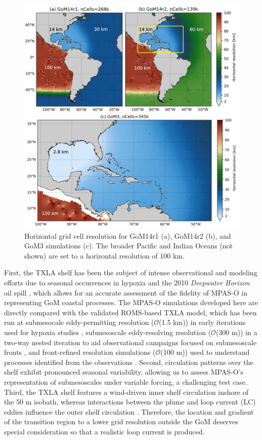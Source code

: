 \begin{figure}[t!]
\centerline{\includegraphics[width = \textwidth]{figures/scgsr/gom_resolutions.jpg}}
    \caption{Horizontal grid cell resolution for GoM14r1 (a), GoM14r2 (b), and GoM3 simulations (c). The broader Pacific and Indian Oceans (not shown) are set to a horizontal resolution of 100 km.}
    \label{fig:mesh_overview}
\end{figure}

First, the TXLA shelf has been the subject of intense observational and modeling efforts due to seasonal occurrences in hypoxia and the 2010 \textit{Deepwater Horizon} oil spill \citep{bianchi2010science,  dukhovskoy2021development, Zhang_2012_forecast}, which allows for an accurate assessment of the fidelity of MPAS-O in representing GoM coastal processes. The MPAS-O simulations developed here are directly compared with the validated ROMS-based TXLA model, which has been run at submesocale eddy-permitting resolution ($\mathcal{O}$(1.5 km)) in early iterations used for hypoxia studies \citep{ruiz2021small, Zhang_2012_numerical}, submesoscale eddy-resolving resolution ($\mathcal{O}$(300 m)) in a two-way nested iteration to aid observational campaigns focused on submesoscale fronts \citep{Qu_2022_NIW, Schlichting23}, and front-refined resolution simulations ($\mathcal{O}$(100 m)) used to understand processes identified from the observations \citep{qu2022rapid}. Second, circulation patterns over the shelf exhibit pronounced seasonal variability, allowing us to assess MPAS-O's representation of submesoscales under variable forcing, a challenging test case. Third, the TXLA shelf features a wind-driven inner shelf circulation inshore of the 50 m isobath, whereas interactions between the plume and loop current (LC) eddies influence the outer shelf circulation \citep{zhang2014wind}. Therefore, the location and gradient of the transition region to a lower grid resolution outside the GoM deserves special consideration so that a realistic loop current is produced.

